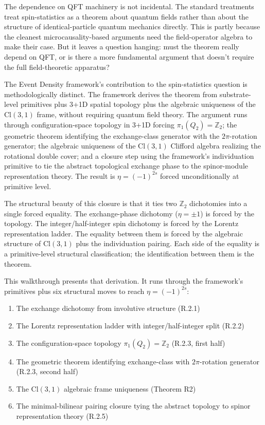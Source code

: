 \documentclass[11pt,a4paper]{article}
\begin{document}
The dependence on QFT machinery is not incidental. The standard treatments treat spin-statistics as a theorem about quantum fields rather than about the structure of identical-particle quantum mechanics directly. This is partly because the cleanest microcausality-based arguments need the field-operator algebra to make their case. But it leaves a question hanging: must the theorem really depend on QFT, or is there a more fundamental argument that doesn't require the full field-theoretic apparatus?

The Event Density framework's contribution to the spin-statistics question is methodologically distinct. The framework derives the theorem from substrate-level primitives plus 3+1D spatial topology plus the algebraic uniqueness of the $\mathrm{Cl}(3,1)$ frame, without requiring quantum field theory. The argument runs through configuration-space topology in 3+1D forcing $\pi_1(Q_2) = \mathbb{Z}_2$; the geometric theorem identifying the exchange-class generator with the $2\pi$-rotation generator; the algebraic uniqueness of the $\mathrm{Cl}(3,1)$ Clifford algebra realizing the rotational double cover; and a closure step using the framework's individuation primitive to tie the abstract topological exchange phase to the spinor-module representation theory. The result is $\eta = (-1)^{2s}$ forced unconditionally at primitive level.

The structural beauty of this closure is that it ties two $\mathbb{Z}_2$ dichotomies into a single forced equality. The exchange-phase dichotomy ($\eta = \pm 1$) is forced by the topology. The integer/half-integer spin dichotomy is forced by the Lorentz representation ladder. The equality between them is forced by the algebraic structure of $\mathrm{Cl}(3,1)$ plus the individuation pairing. Each side of the equality is a primitive-level structural classification; the identification between them is the theorem.

This walkthrough presents that derivation. It runs through the framework's primitives plus six structural moves to reach $\eta = (-1)^{2s}$:

\begin{enumerate}[noitemsep]
\item The exchange dichotomy from involutive structure (R.2.1)
\item The Lorentz representation ladder with integer/half-integer split (R.2.2)
\item The configuration-space topology $\pi_1(Q_2) = \mathbb{Z}_2$ (R.2.3, first half)
\item The geometric theorem identifying exchange-class with $2\pi$-rotation generator (R.2.3, second half)
\item The $\mathrm{Cl}(3,1)$ algebraic frame uniqueness (Theorem R2)
\item The minimal-bilinear pairing closure tying the abstract topology to spinor representation theory (R.2.5)
\end{enumerate}
\end{document}
